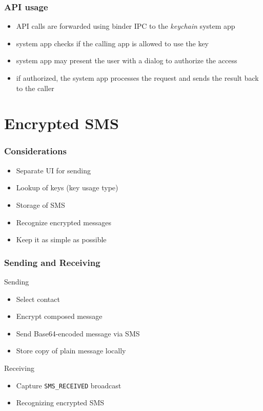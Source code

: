 \documentclass{beamer}
\begin{document}
	\begin{frame}
		\frametitle{API usage}
		\begin{itemize}
			\item API calls are forwarded using binder IPC to the {\em keychain} system app
			\item system app checks if the calling app is allowed to use the key
			\item system app may present the user with a dialog to authorize the access
			\item if authorized, the system app processes the request and sends the result back to the caller
		\end{itemize}
	\end{frame}

\section{Encrypted SMS}
	\begin{frame}
		\tableofcontents[currentsection]
	\end{frame}
	\begin{frame}
	\frametitle{Considerations}
		\begin{itemize}
			\item Separate UI for sending
			\item Lookup of keys (key usage type)
			\item Storage of SMS %
			\item Recognize encrypted messages
			\item Keep it as simple as possible %
		\end{itemize}
	\end{frame}
	\begin{frame}
	\frametitle{Sending and Receiving}
		\begin{block}{Sending}
			\begin{itemize}
				\item Select contact
				\item Encrypt composed message
				\item Send Base64-encoded message via SMS
				\item Store copy of plain message locally
			\end{itemize}
		\end{block}
		\begin{block}{Receiving}
			\begin{itemize}
				\item Capture {\tt SMS\_RECEIVED} broadcast
				\item Recognizing encrypted SMS
			\end{itemize}
		\end{block}
	\end{frame}
\end{document}
